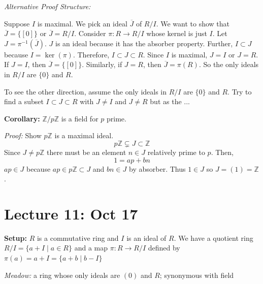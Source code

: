\documentclass[12pt]{report}
\newcommand{\Z}{\mathbb{Z}}
\begin{document}
\emph{Alternative Proof Structure:} 

Suppose $I$ is maximal. We pick an ideal $\overline J$ of $R/I$. We want to show that $\overline J = \{[0]\}$ or $\overline J = R/I$. Consider $\pi: R \to R/I$ whose kernel is just $I$. Let $J = \pi^{-1}(\overline J)$. $J$ is an ideal because it has the absorber property. Further, $I \subset J$ because $I = \ker(\pi)$. Therefore, $I \subset J \subset R$. Since $I$ is maximal, $J = I$ or $J = R$. If $J = I$, then $\overline J = \{[0]\}$. Similarly, if $J = R$, then $\overline J = \pi(R)$. So the only ideals in $R/I$ are $\{0\}$ and $R$. 

To see the other direction, assume the only ideals in $R/I$ are $\{0\}$ and $R$. Try to find a subset $I \subset J \subset R$ with $J \neq I$ and $J \neq R$ but as the \color{red} ... \color{black}

\textbf{Corollary:} $\Z/p\Z$ is a field for $p$ prime. 

\emph{Proof:} Show $p\Z$ is a maximal ideal. 
\[p\Z \subsetneq J \subset \Z\] 
Since $J \neq p\Z$ there must be an element $n \in J$ relatively prime to $p$. Then, 
\[1 = ap + bn\] 
$ap \in J$ because $ap \in p\Z \subset J$ and $bn \in J$ by absorber. Thus $1 \in J$ so $J = (1) = \Z$. 

\section*{Lecture 11: Oct 17}
\textbf{Setup:} $R$ is a commutative ring and $I$ is an ideal of $R$. We have a quotient ring $R/I = \{a + I \; | \; a \in R\}$ and a map $\pi: R \to R/I$ defined by $\pi(a) = a + I = \{a + b \; | \; b - I\}$ 

\begin{center}
\end{center}

\emph{Meadow:} a ring whose only ideals are $(0)$ and $R$; synonymous with field
\end{document}

